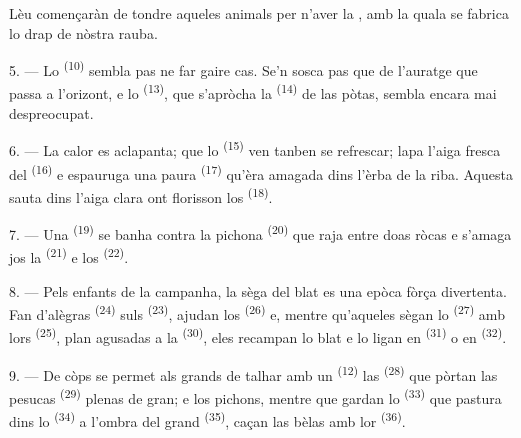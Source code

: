 Lèu començaràn de tondre aqueles animals per n'aver la , amb la
quala se fabrica lo drap de nòstra rauba.

\VUsaut{5.0mm}
\VUsaut{3.4mm}

5. --- Lo  \textsuperscript{(10)} sembla pas ne far gaire cas.
Se'n sosca pas que de l'auratge que passa a l'orizont, e lo 
\textsuperscript{(13)}, que s'apròcha la  \textsuperscript{(14)} de
las pòtas, sembla encara mai despreocupat.

6. --- La calor es aclapanta; que lo  \textsuperscript{(15)} ven
tanben se refrescar; lapa l'aiga fresca del  \textsuperscript{(16)} e
espauruga una paura  \textsuperscript{(17)} qu'èra amagada dins
l'èrba de la riba. Aquesta sauta dins l'aiga clara ont florisson los
 \textsuperscript{(18)}.

7. --- Una  \textsuperscript{(19)} se banha contra la pichona
 \textsuperscript{(20)} que raja entre doas ròcas e s'amaga jos la
 \textsuperscript{(21)} e los  \textsuperscript{(22)}.

\VUsaut{5.0mm}
\VUsaut{3.4mm}

8. --- Pels enfants de la campanha, la sèga del blat es una epòca fòrça
divertenta. Fan d'alègras  \textsuperscript{(24)} suls
 \textsuperscript{(23)}, ajudan los 
\textsuperscript{(26)} e, mentre qu'aqueles sègan lo 
\textsuperscript{(27)} amb lors  \textsuperscript{(25)}, plan
agusadas a la  \textsuperscript{(30)}, eles recampan lo
blat e lo ligan en  \textsuperscript{(31)} o en 
\textsuperscript{(32)}.

9. --- De còps se permet als grands de talhar amb un 
\textsuperscript{(12)} las  \textsuperscript{(28)} que
pòrtan las pesucas  \textsuperscript{(29)} plenas de gran; e los
pichons, mentre que gardan lo  \textsuperscript{(33)} que pastura
dins lo  \textsuperscript{(34)} a l'ombra del grand 
\textsuperscript{(35)}, caçan las bèlas  amb lor
 \textsuperscript{(36)}.

